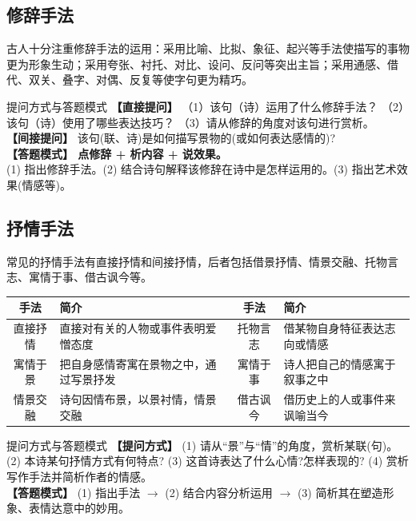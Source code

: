 \documentclass[11pt, a4paper]{ctexart}
\begin{document}
\subsection{修辞手法}
古人十分注重修辞手法的运用：采用比喻、比拟、象征、起兴等手法使描写的事物更为形象生动；采用夸张、衬托、对比、设问、反问等突出主旨；采用通感、借代、双关、叠字、对偶、反复等使字句更为精巧。

\begin{tipsbox}{提问方式与答题模式}
\textbf{【直接提问】} （1）该句（诗）运用了什么修辞手法？ （2）该句（诗）使用了哪些表达技巧？ （3）请从修辞的角度对该句进行赏析。\\
\textbf{【间接提问】} 该句(联、诗)是如何描写景物的(或如何表达感情的)?\\
\textbf{【答题模式】 点修辞 + 析内容 + 说效果。}\\
(1) 指出修辞手法。(2) 结合诗句解释该修辞在诗中是怎样运用的。(3) 指出艺术效果(情感等)。
\end{tipsbox}

\subsection{抒情手法}
常见的抒情手法有直接抒情和间接抒情，后者包括借景抒情、情景交融、托物言志、寓情于事、借古讽今等。

\begin{table}[htbp]
\centering\small
\renewcommand{\arraystretch}{1.15}
\begin{tabularx}{\textwidth}{|c|X|c|X|}
\hline
\textbf{手法} & \textbf{简介} & \textbf{手法} & \textbf{简介} \\
\hline
直接抒情 & 直接对有关的人物或事件表明爱憎态度 & 托物言志 & 借某物自身特征表达志向或情感 \\
\hline
寓情于景 & 把自身感情寄寓在景物之中，通过写景抒发 & 寓情于事 & 诗人把自己的情感寓于叙事之中 \\
\hline
情景交融 & 诗句因情布景，以景衬情，情景交融 & 借古讽今 & 借历史上的人或事件来讽喻当今 \\
\hline
\end{tabularx}
\end{table}

\begin{tipsbox}{提问方式与答题模式}
\textbf{【提问方式】} (1) 请从“景”与“情”的角度，赏析某联(句)。 (2) 本诗某句抒情方式有何特点? (3) 这首诗表达了什么心情?怎样表现的? (4) 赏析写作手法并简析作者的情感。\\
\textbf{【答题模式】} (1) 指出手法 $\rightarrow$ (2) 结合内容分析运用 $\rightarrow$ (3) 简析其在塑造形象、表情达意中的妙用。
\end{tipsbox}
\end{document}
